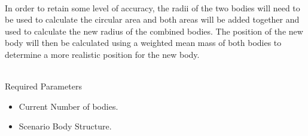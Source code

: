\paragraph{}
In order to retain some level of accuracy, the radii of the two bodies will need to be used to calculate the circular area and both areas will be added together and used to calculate the new radius of the combined bodies. The position of the new body will then be calculated using a weighted mean mass of both bodies to determine a more realistic position for the new body. \\\

Required Parameters
\begin{itemize}
\item Current Number of bodies.
\item Scenario Body Structure.
\end{itemize}
